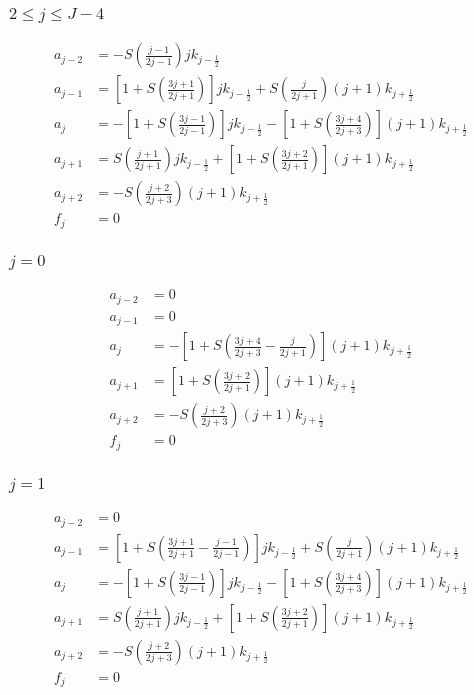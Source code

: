 \documentclass[12pt]{article}
\numberwithin{equation}{section}
\begin{document}
\subsubsection{$2 \le j \le J-4$}
\begin{align}
	a_{j-2}
	&=
	-S\left( \frac{j-1}{2j - 1} \right) j k_{j-\frac{1}{2}}
	\\
	a_{j-1}
	&=
	\left[
		1 + S \left(\frac{3j+1}{2j + 1}\right)
	\right] jk_{j-\frac{1}{2}}
	+
	S \left(
		\frac{j}{2j + 1}
	\right) (j+1) k_{j+\frac{1}{2}}
	\\
	a_{j}
	&=
	-  \left[
		1 + S \left( \frac{3j - 1}{2j - 1} \right)
	\right]
	j k_{j-\frac{1}{2}}
	-
	\left[
		1 + S\left( \frac{3j + 4}{2j + 3} \right)
	\right](j+1) k_{j+\frac{1}{2}}
	\\
	a_{j+1}
	&=
	S\left(
		\frac{j + 1}{2j + 1} 
	\right) jk_{j-\frac{1}{2}}
	+
	\left[
		1 + S \left( \frac{3j+2}{2j + 1} \right)
	\right] (j+1)k_{j+\frac{1}{2}}
	\\
	a_{j+2}
	&=
	-S
	\left(
		\frac{j+2}{2j +3} 
	\right)(j+1)k_{j+\frac{1}{2}}
	\\
	f_j 
	&=
	0
\end{align}

\subsubsection{$j = 0$}
\begin{align}
	a_{j-2}
	&=
	0
	\\
	a_{j-1}
	&=
	0
	\\
	a_{j}
	&=
	-
	\left[
		1 + S\left( \frac{3j + 4}{2j + 3} - \frac{j}{2j + 1} \right)
	\right](j+1) k_{j+\frac{1}{2}}
	\\
	a_{j+1}
	&=
	\left[
		1 + S \left( \frac{3j+2}{2j + 1} \right)
	\right] (j+1)k_{j+\frac{1}{2}}
	\\
	a_{j+2}
	&=
	-S
	\left(
		\frac{j+2}{2j +3} 
	\right)(j+1)k_{j+\frac{1}{2}}
	\\
	f_j 
	&=
	0
\end{align}

\subsubsection{$j = 1$}

\begin{align}
	a_{j-2}
	&=
	0
	\\
	a_{j-1}
	&=
	\left[
		1 + S \left(\frac{3j+1}{2j + 1} -  \frac{j-1}{2j - 1}\right)
	\right] jk_{j-\frac{1}{2}}
	+
	S \left(
		\frac{j}{2j + 1}
	\right) (j+1) k_{j+\frac{1}{2}}
	\\
	a_{j}
	&=
	-  \left[
		1 + S \left( \frac{3j - 1}{2j - 1} \right)
	\right]
	j k_{j-\frac{1}{2}}
	-
	\left[
		1 + S\left( \frac{3j + 4}{2j + 3} \right)
	\right](j+1) k_{j+\frac{1}{2}}
	\\
	a_{j+1}
	&=
	S\left(
		\frac{j + 1}{2j + 1} 
	\right) jk_{j-\frac{1}{2}}
	+
	\left[
		1 + S \left( \frac{3j+2}{2j + 1} \right)
	\right] (j+1)k_{j+\frac{1}{2}}
	\\
	a_{j+2}
	&=
	-S
	\left(
		\frac{j+2}{2j +3} 
	\right)(j+1)k_{j+\frac{1}{2}}
	\\
	f_j 
	&=
	0
\end{align}
\end{document}
